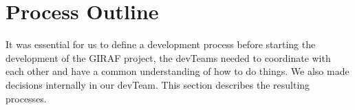 \chapter{Process Outline}

It was essential for us to define a development process before starting the development of the GIRAF project, the \glspl{devTeam} needed to coordinate with each other and have a common understanding of how to do  things. We also made decisions internally in our \gls{devTeam}. This section describes the resulting processes. 
